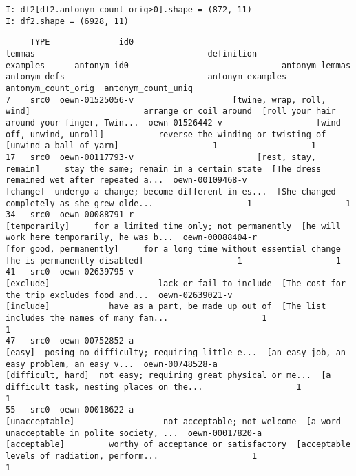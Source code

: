 \documentclass[a4paper,10pt,onecolumn,oneside,openright]{article}
\begin{document}
\begin{verbatim}
I: df2[df2.antonym_count_orig>0].shape = (872, 11)
I: df2.shape = (6928, 11)
\end{verbatim}
\begin{verbatim}
     TYPE              id0                                       lemmas                                   definition                                     examples      antonym_id0                               antonym_lemmas                                 antonym_defs                             antonym_examples  antonym_count_orig  antonym_count_uniq
7    src0  oewn-01525056-v                    [twine, wrap, roll, wind]                       arrange or coil around  [roll your hair around your finger, Twin...  oewn-01526442-v                   [wind off, unwind, unroll]           reverse the winding or twisting of                      [unwind a ball of yarn]                   1                   1
17   src0  oewn-00117793-v                         [rest, stay, remain]     stay the same; remain in a certain state  [The dress remained wet after repeated a...  oewn-00109468-v                                     [change]  undergo a change; become different in es...  [She changed completely as she grew olde...                   1                   1
34   src0  oewn-00088791-r                                [temporarily]     for a limited time only; not permanently  [he will work here temporarily, he was b...  oewn-00088404-r                      [for good, permanently]     for a long time without essential change                 [he is permanently disabled]                   1                   1
41   src0  oewn-02639795-v                                    [exclude]                      lack or fail to include  [The cost for the trip excludes food and...  oewn-02639021-v                                    [include]            have as a part, be made up out of  [The list includes the names of many fam...                   1                   1
47   src0  oewn-00752852-a                                       [easy]  posing no difficulty; requiring little e...  [an easy job, an easy problem, an easy v...  oewn-00748528-a                            [difficult, hard]  not easy; requiring great physical or me...  [a difficult task, nesting places on the...                   1                   1
55   src0  oewn-00018622-a                               [unacceptable]                  not acceptable; not welcome  [a word unacceptable in polite society, ...  oewn-00017820-a                                 [acceptable]         worthy of acceptance or satisfactory  [acceptable levels of radiation, perform...                   1                   1

\end{verbatim}
\end{document}
